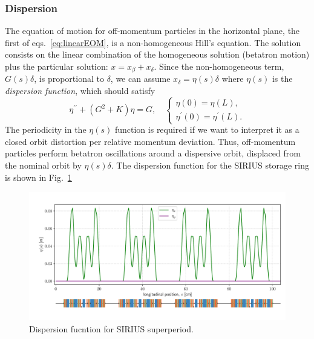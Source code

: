 \subsubsection{Dispersion}
The equation of motion for off-momentum particles in the horizontal plane, the first of eqs.~\eqref{eq:linearEOM}, is a non-homogeneous Hill's equation. The solution consists on the linear combination of the homogeneous solution (betatron motion)  plus the particular solution: $x=x_\beta+ x_\delta$. Since the non-homogeneous term, $G(s)\delta$, is proportional to $\delta$, we can assume  $x_{\delta} = \eta(s)\delta$ where $\eta(s)$ is the \textit{dispersion function}, which should satisfy
    \begin{equation*}
        \eta^{\prime\prime}+(G^2+K)\eta=G,\quad
        \begin{cases}
            \eta(0) = \eta(L),\\
            \eta^\prime(0) = \eta^\prime(L).
        \end{cases}
    \end{equation*}
    The periodicity in the $\eta(s)$ function is required if we want to interpret it as a closed orbit distortion per relative momentum deviation. Thus, off-momentum particles perform betatron oscillations around a dispersive orbit, displaced from the nominal orbit by $\eta(s)\delta$. The dispersion function for the SIRIUS storage ring is shown in Fig.~\ref{dispersion_func}
    \begin{figure}[htb]
        \centering
        \includegraphics[width=\textwidth]{Images/dispersion.pdf}
        \caption{Dispersion fucntion for SIRIUS superperiod.}
        \label{dispersion_func}
    \end{figure}
